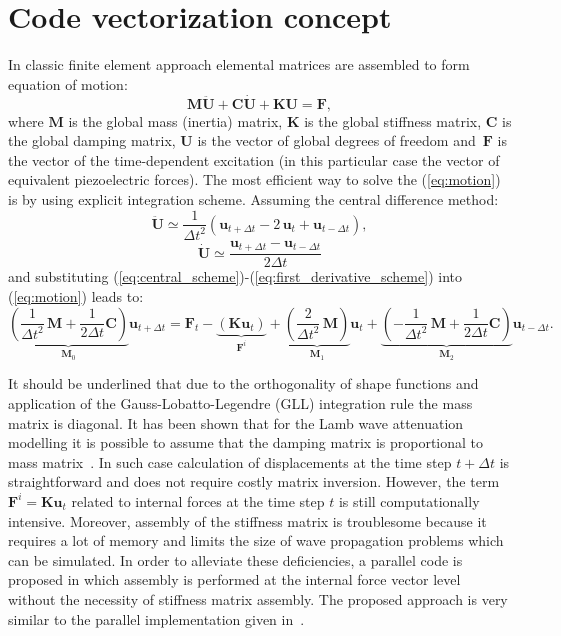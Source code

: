 \documentclass[runningheads]{llncs}
\renewcommand{\vec}[1]{\mathbf{#1}}
\newcommand{\bm}[1]{\mathbf{#1}}
\begin{document}
\section{Code vectorization concept}
In classic finite element approach elemental matrices are assembled to form equation of motion:
\begin{equation}
\bm{M} \vec{\ddot{U}} + \bm{C} \vec{\dot{U}} + \bm{K} \vec{U} = \vec{F}, \label{eq:motion}
\end{equation}  
where \( \bm{M} \) is the global mass (inertia) matrix, \( \bm{K} \) is the global stiffness matrix,  \(\bm{C} \) is the global damping matrix, \(\vec{U}\) is the vector of global degrees of freedom and~\(\vec{F}\) is the vector of the time-dependent excitation (in this particular case the vector of equivalent piezoelectric forces). 
The most efficient way to solve the (\ref{eq:motion}) is by using explicit integration scheme. 
Assuming the central difference method:
\begin{equation}
\ddot{\vec{U}}\simeq \frac{1}{\Delta t^2} \left(\vec{u}_{t+\Delta t} - 2\,\vec{u}_t + \vec{u}_{t-\Delta t}\right), \label{eq:central_scheme}
\end{equation}
\begin{equation}
\dot{\vec{U}}\simeq \frac{\vec{u}_{t+\Delta t} -\vec{u}_{t-\Delta t}}{2 \Delta t}
\label{eq:first_derivative_scheme}
\end{equation}
and substituting (\ref{eq:central_scheme})-(\ref{eq:first_derivative_scheme}) into (\ref{eq:motion}) leads to:
\begin{equation}
	\underbrace{\left(\frac{1}{\Delta t^2} \,\bm{M} + \frac{1}{2 \Delta t} \bm{C}\right)}_{\vec{M}_0} \vec{u}_{t+\Delta t} = \vec{F}_t - \underbrace{\left(\bm{K} \vec{u}_t\right)}_{\vec{F}^i} + \underbrace{\left(\frac{2}{\Delta t^2} \,\bm{M} \right)}_{\vec{M}_1}\vec{u}_t 
	+ \underbrace{\left(- \frac{1}{\Delta t^2} \,\bm{M} + \frac{1}{2 \Delta t} \bm{C}\right)}_{\vec{M}_2} \vec{u}_{t-\Delta t}.
\label{eq:explicit_integration}
\end{equation}

It should be underlined that due to the orthogonality of shape functions and application of the Gauss-Lobatto-Legendre (GLL) integration rule the mass matrix is diagonal. 
It has been shown that for the Lamb wave attenuation modelling it is possible to assume that the damping matrix is proportional to mass matrix~\cite{Wandowski2017}. In such case calculation of displacements at the time step \(t + \Delta t\) is straightforward and does not require costly matrix inversion. 
However, the term \(\vec{F}^i=\bm{K}\vec{u}_t\) related to internal forces at the time step \(t\) is still computationally intensive. 
Moreover, assembly of the stiffness matrix is troublesome because it requires a lot of memory and limits the size of wave propagation problems which can be simulated. 
In order to alleviate these deficiencies, a parallel code is proposed in which assembly is performed at the internal force vector level without the necessity of stiffness matrix assembly. 
The proposed approach is very similar to the parallel implementation given in~\cite{Kudela2016}. 
\end{document}
